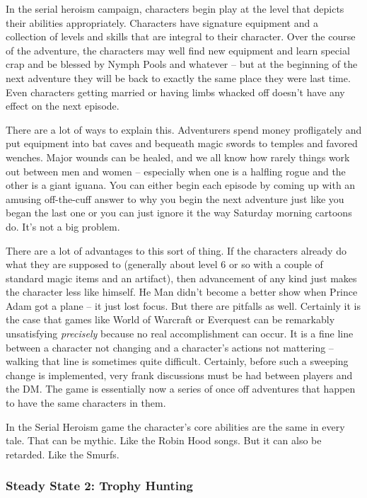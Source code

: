 In the serial heroism campaign, characters begin play at the level that depicts their abilities appropriately. Characters have signature equipment and a collection of levels and skills that are integral to their character. Over the course of the adventure, the characters may well find new equipment and learn special crap and be blessed by Nymph Pools and whatever -- but at the beginning of the next adventure they will be back to exactly the same place they were last time. Even characters getting married or having limbs whacked off doesn't have any effect on the next episode.

There are a lot of ways to explain this. Adventurers spend money profligately and put equipment into bat caves and bequeath magic swords to temples and favored wenches. Major wounds can be healed, and we all know how rarely things work out between men and women -- especially when one is a halfling rogue and the other is a giant iguana. You can either begin each episode by coming up with an amusing off-the-cuff answer to why you begin the next adventure just like you began the last one or you can just ignore it the way Saturday morning cartoons do. It's not a big problem.

There are a lot of advantages to this sort of thing. If the characters already do what they are supposed to (generally about level 6 or so with a couple of standard magic items and an artifact), then advancement of any kind just makes the character less like himself. He Man didn't become a better show when Prince Adam got a plane -- it just lost focus. But there are pitfalls as well. Certainly it is the case that games like World of Warcraft or Everquest can be remarkably unsatisfying \textit{precisely} because no real accomplishment can occur. It is a fine line between a character not changing and a character's actions not mattering -- walking that line is sometimes quite difficult. Certainly, before such a sweeping change is implemented, very frank discussions must be had between players and the DM. The game is essentially now a series of once off adventures that happen to have the same characters in them.

In the Serial Heroism game the character's core abilities are the same in every tale. That can be mythic. Like the Robin Hood songs. But it can also be retarded. Like the Smurfs.

\subsubsection{Steady State 2: Trophy Hunting}
\vspace*{-8pt}

